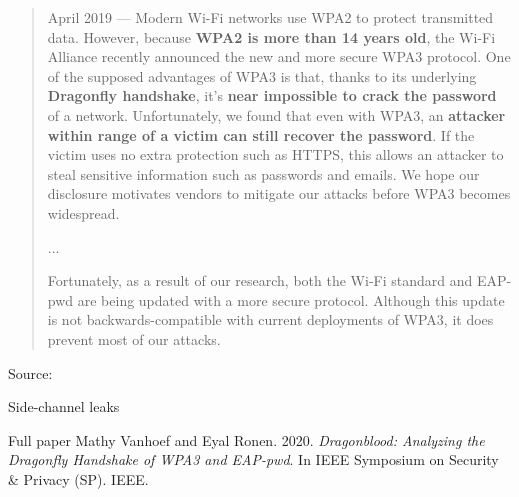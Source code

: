 \documentclass[Screen16to9,17pt]{foils}
\begin{document}


\begin{quote}\small
April 2019 — Modern Wi-Fi networks use WPA2 to protect transmitted data. However, because {\bf WPA2 is more than 14 years old}, the Wi-Fi Alliance recently announced the new and more secure WPA3 protocol. One of the supposed advantages of WPA3 is that, thanks to its underlying {\bf Dragonfly handshake}, it's {\bf near impossible to crack the password} of a network. Unfortunately, we found that even with WPA3, an {\bf attacker within range of a victim can still recover the password}. If the victim uses no extra protection such as HTTPS, this allows an attacker to steal sensitive information such as passwords and emails. We hope our disclosure motivates vendors to mitigate our attacks before WPA3 becomes widespread.

...

Fortunately, as a result of our research, both the Wi-Fi standard and EAP-pwd are being updated with a more secure protocol. Although this update is not backwards-compatible with current deployments of WPA3, it does prevent most of our attacks.
\end{quote}
Source: 


\begin{list2}
\item Side-channel leaks
\item Full paper Mathy Vanhoef and Eyal Ronen. 2020. \emph{Dragonblood: Analyzing the Dragonfly Handshake of WPA3 and EAP-pwd}. In IEEE Symposium on Security \& Privacy (SP). IEEE.

\end{list2}


\end{document}

